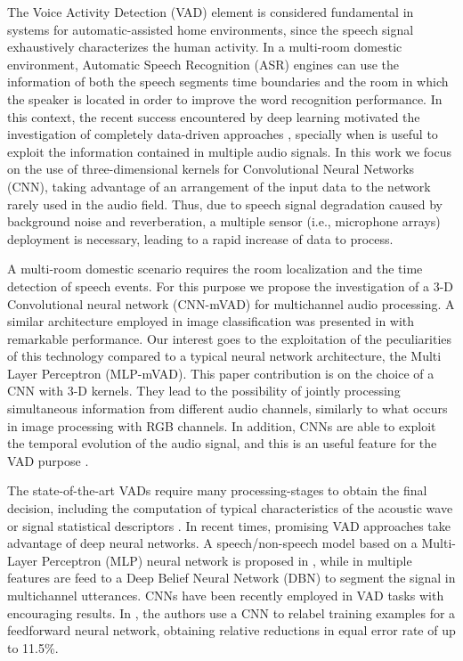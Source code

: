 The Voice Activity Detection (VAD) element is considered fundamental in systems for automatic-assisted home environments, since the speech signal exhaustively characterizes the human activity. In a multi-room domestic environment, Automatic Speech Recognition (ASR) engines can use the information of both the speech segments time boundaries and the room in which the speaker is located in order to improve the  word recognition performance.
In this context, the recent success encountered by deep learning motivated the investigation of completely data-driven approaches \cite{ijcnn-vad,ijcnn2016-vad}, specially when is useful to exploit the information contained in multiple audio signals. In this work we focus on the use of three-dimensional kernels for Convolutional Neural Networks (CNN), taking advantage of an arrangement of the input data to the network rarely used in the audio field.
Thus, due to speech signal degradation caused by background noise and reverberation, a multiple sensor (i.e., microphone arrays) deployment is necessary, leading to a rapid increase of data to process.

A multi-room domestic scenario requires the room localization and the time detection of speech events. For this purpose we propose the investigation of a 3-D Convolutional neural network (CNN-mVAD) for multichannel audio processing. 
A similar architecture employed in image classification was presented in \cite{krizhevsky2012imagenet} with remarkable performance.
Our interest goes to the exploitation of the peculiarities of this technology compared to a typical neural network architecture, the Multi Layer Perceptron (MLP-mVAD). This paper contribution is on the choice of a CNN with 3-D kernels. They lead to the possibility of jointly processing simultaneous information from different audio channels, similarly to what occurs in image processing with RGB channels. In addition, CNNs are able to exploit the temporal evolution of the audio signal, and this is an useful feature for the VAD purpose \cite{zhang_2016_vad}.
 
The state-of-the-art VADs require many processing-stages to obtain the final decision, including the computation of typical characteristics of the acoustic wave or signal statistical descriptors \cite{giannoulis2014athena}. In recent times, promising VAD approaches take advantage of deep neural networks. A speech/non-speech model based on a Multi-Layer Perceptron (MLP) neural network is proposed in \cite{abadl2f}, while in \cite{morales2014distant} multiple features are feed to a Deep Belief Neural Network (DBN) to segment the signal in multichannel utterances. CNNs have been recently employed in VAD tasks \cite{mcloughlin2015low,6854054} with encouraging results. In \cite{Price2016}, the authors use a CNN to relabel training examples for a feedforward neural network, obtaining relative reductions in equal error rate of up to 11.5\%.


